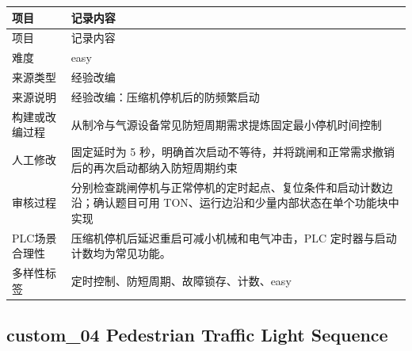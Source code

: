 \begin{longtable}{L{3.0cm}L{10.3cm}}

\toprule

项目 & 记录内容\\

\midrule

\endfirsthead

\toprule

项目 & 记录内容\\

\midrule

\endhead

难度 & easy\\

来源类型 & 经验改编\\

来源说明 & 经验改编：压缩机停机后的防频繁启动\\

构建或改编过程 & 从制冷与气源设备常见防短周期需求提炼固定最小停机时间控制\\

人工修改 & 固定延时为 5 秒，明确首次启动不等待，并将跳闸和正常需求撤销后的再次启动都纳入防短周期约束\\

审核过程 & 分别检查跳闸停机与正常停机的定时起点、复位条件和启动计数边沿；确认题目可用 TON、运行边沿和少量内部状态在单个功能块中实现\\

PLC场景合理性 & 压缩机停机后延迟重启可减小机械和电气冲击，PLC 定时器与启动计数均为常见功能。\\

多样性标签 & 定时控制、防短周期、故障锁存、计数、easy\\

\bottomrule

\end{longtable}

\subsection{{\ttfamily custom\_04} Pedestrian Traffic Light Sequence}

